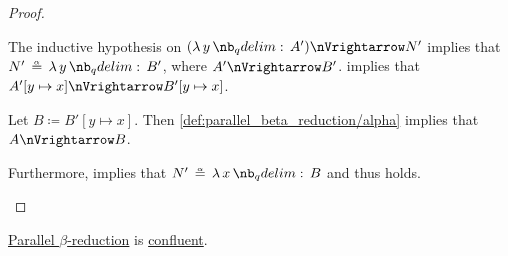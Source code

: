 \begin{proof}
\begin{itemize}
\begin{itemize}
      The inductive hypothesis on \( (\qabs y A') \pred N' \) implies that \( N' \aequiv \qabs y B' \), where \( A' \pred B' \).  implies that \( A'[y \mapsto x] \pred B'[y \mapsto x] \).

      Let \( B \coloneqq B'[y \mapsto x] \). Then \ref{def:parallel_beta_reduction/alpha} implies that \( A \pred B \).

      Furthermore,  implies that \( N' \aequiv \qabs x B \) and thus  holds.
    \end{itemize}
  \end{itemize}
\end{proof}

\begin{proposition}\label{thm:parallel_beta_church_rosser}
  \hyperref[def:parallel_beta_reduction]{Parallel \( \beta \)-reduction} is \hyperref[def:relation_confluence]{confluent}.
\end{proposition}
